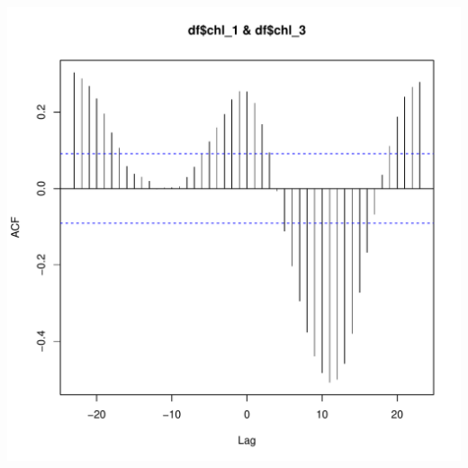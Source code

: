 \documentclass{article}\usepackage[]{graphicx}\usepackage[]{color}
\makeatletter
\def\maxwidth{ %
  \ifdim\Gin@nat@width>\linewidth
    \linewidth
  \else
    \Gin@nat@width
  \fi
}
\newenvironment{knitrout}{}{} %
\makeatother
\begin{document}
\begin{knitrout}
\includegraphics[width=\maxwidth]{figure/unnamed-chunk-5-2} 

\end{knitrout}
\end{document}

